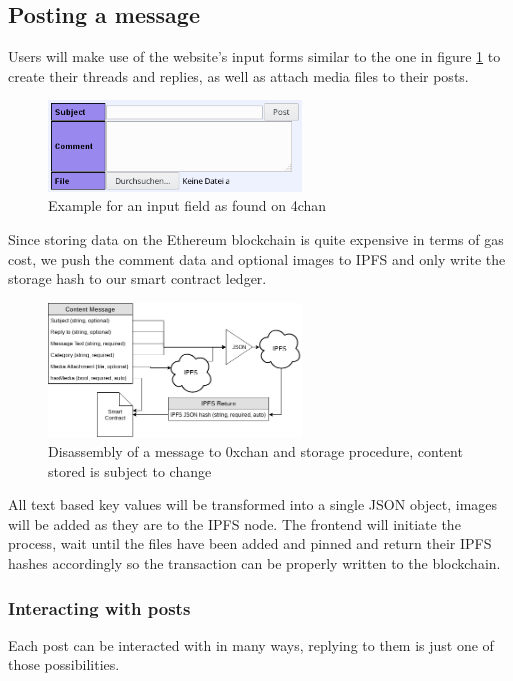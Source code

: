 \documentclass[a4paper]{article}
\begin{document}
\subsection{Posting a message}
Users will make use of the website's input forms similar to the one in figure \ref{fig:input} to create their threads and replies, as well as attach media files to their posts.

\begin{figure}[H]
  \centering
  \includegraphics[width=0.6\textwidth]{0x_4chan_post.png}
  \caption{Example for an input field as found on 4chan}
  \label{fig:input}
\end{figure}

Since storing data on the Ethereum blockchain is quite expensive in terms of gas cost, we push the comment data and optional images to IPFS and only write the storage hash to our smart contract ledger.

\begin{figure}[H]
  \centering
  \includegraphics[width=0.6\textwidth]{0x_logic.png}
  \caption{Disassembly of a message to 0xchan and storage procedure, content stored is subject to change}
  \label{fig:logic}
\end{figure}

All text based key values will be transformed into a single JSON object, images will be added as they are to the IPFS node. The frontend will initiate the process, wait until the files have been added and pinned and return their IPFS hashes accordingly so the transaction can be properly written to the blockchain.

\subsubsection{Interacting with posts}
Each post can be interacted with in many ways, replying to them is just one of those possibilities.
\end{document}
